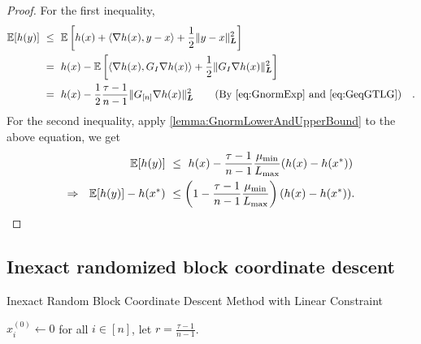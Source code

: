\begin{proof}
    For the first inequality,
    \begin{align*}
       \mathbb{E}[ h(y) ] &~\leq~ \mathbb{E} \left[ h(x) + \langle \nabla h(x), y - x \rangle + \frac{1}{2} \| y - x \|_{\boldsymbol{L}}^2 \right] \\
       &~=~ h(x) - \mathbb{E} \left[ \langle \nabla h(x), G_I \nabla h(x) \rangle + \frac{1}{2}  \| G_I \nabla h(x) \|_{\boldsymbol{L}}^2 \right] \\
       &~=~ h(x) - \frac{1}{2} \frac{\tau-1}{n-1} \| G_{[n]} \nabla h(x) \|_{\boldsymbol{L}}^2 \quad \hbox{\quad(By \eqref{eq:GnormExp} and \eqref{eq:GeqGTLG})\quad}.
    \end{align*}
    For the second inequality, apply \autoref{lemma:GnormLowerAndUpperBound} to the above equation, we get
    \begin{align*}
        \mathbb{E}[ h(y) ] &~\leq~ h(x) - \frac{\tau-1}{n-1} \frac{\mu_{\min}}{L_{\max}} ( h( x ) - h(x^*) ) \\
        \Rightarrow~~ \mathbb{E}[ h(y) ] - h(x^*) &~\leq \left(1 -  \frac{\tau-1}{n-1} \frac{\mu_{\min}}{L_{\max}} \right) ( h(x) - h(x^*) ). 
    \end{align*}
\end{proof}


\subsection{Inexact randomized block coordinate descent} \label{appendix:inexact_rbcd}

\begin{algorithm}[t] 
    \DontPrintSemicolon
    \caption{Inexact Random Block Coordinate Descent Method with Linear Constraint}
    \label{alg:inexactrbcd}
    \smallskip
    $x_i^{(0)} \gets 0$ for all $i \in [n]$, let $r =\frac{\tau-1}{n-1}$. 
\end{algorithm}

